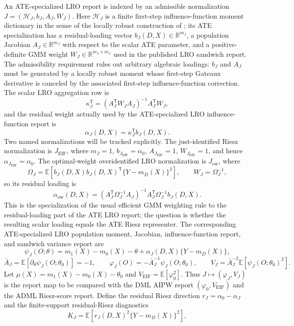 \documentclass[11pt]{article}
\newcommand{\E}{\mathbb{E}}
\newcommand{\transpose}{\mathsf{T}}
\newcommand{\R}{\mathbb{R}}
\theoremstyle{definition}
\theoremstyle{plain}
\theoremstyle{remark}
\begin{document}
An ATE-specialized LRO report is indexed by an admissible normalization $J=(\mathcal H_J,b_J,A_J,W_J)$.  Here $\mathcal H_J$ is a finite first-step influence-function moment dictionary in the sense of the locally robust construction of \citet{ChernozhukovEscancianoIchimuraNeweyRobins2022LRO}; its ATE specialization has a residual-loading vector $b_J(D,X)\in\R^{m_J}$, a population Jacobian $A_J\in\R^{m_J}$ with respect to the scalar ATE parameter, and a positive-definite GMM weight $W_J\in\R^{m_J\times m_J}$ used in the published LRO sandwich report.  The admissibility requirement rules out arbitrary algebraic loadings: $b_J$ and $A_J$ must be generated by a locally robust moment whose first-step Gateaux derivative is canceled by the associated first-step influence-function correction.  The scalar LRO aggregation row is
\[
  \kappa_J^\transpose=(A_J^\transpose W_JA_J)^{-1}A_J^\transpose W_J,
\]
and the residual weight actually used by the ATE-specialized LRO influence-function report is
\[
  \alpha_J(D,X)=\kappa_J^\transpose b_J(D,X).
\]
Two named normalizations will be tracked explicitly.  The just-identified Riesz normalization is $J_{\mathrm{EIF}}$, where $m_J=1$, $b_{J_{\mathrm{EIF}}}=\alpha_0$, $A_{J_{\mathrm{EIF}}}=1$, $W_{J_{\mathrm{EIF}}}=1$, and hence $\alpha_{J_{\mathrm{EIF}}}=\alpha_0$.  The optimal-weight overidentified LRO normalization is $J_{\mathrm{ow}}$, where
\[
  \Omega_J=\E\!\left[b_J(D,X)b_J(D,X)^\transpose\{Y-m_D(X)\}^2\right],\qquad
  W_J=\Omega_J^{-1},
\]
so its residual loading is
\[
  \alpha_{\mathrm{ow}}(D,X)
  =(A_J^\transpose\Omega_J^{-1}A_J)^{-1}A_J^\transpose\Omega_J^{-1}b_J(D,X).
\]
This is the specialization of the usual efficient GMM weighting rule to the residual-loading part of the ATE LRO report; the question is whether the resulting scalar loading equals the ATE Riesz representer.
The corresponding ATE-specialized LRO population moment, Jacobian, influence-function report, and sandwich variance report are
\[
  \psi_J(O;\theta)=m_1(X)-m_0(X)-\theta+\alpha_J(D,X)\{Y-m_D(X)\},
\]
\[
  \bar A_J=\E[\partial_\theta\psi_J(O;\theta_0)]=-1,\qquad
  \varphi_J(O)=-\bar A_J^{-1}\psi_J(O;\theta_0),\qquad
  V_J=\bar A_J^{-2}\E[\psi_J(O;\theta_0)^2].
\]
Let $\mu(X)=m_1(X)-m_0(X)-\theta_0$ and $V_{\mathrm{EIF}}=\E[\varphi_0^2]$.  Thus $J\mapsto(\varphi_J,V_J)$ is the report map to be compared with the DML AIPW report $(\varphi_0,V_{\mathrm{EIF}})$ and the ADML Riesz-score report.  Define the residual Riesz direction $r_J=\alpha_0-\alpha_J$ and the finite-support residual-Riesz diagnostics
\[
  K_J=\E\!\left[r_J(D,X)^2\{Y-m_D(X)\}^2\right],
\]
\end{document}
